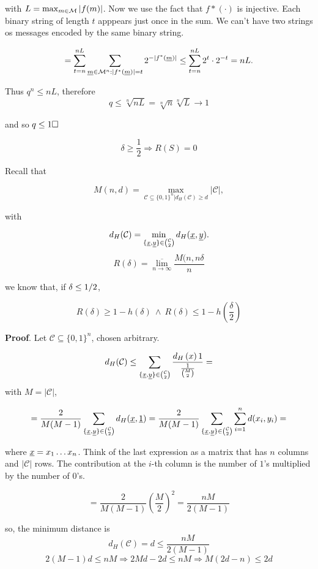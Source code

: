 with $L = \max_{m \in \mathcal{M}} |f(m)|$. Now we use the fact that $f*(\cdot)$ is injective. Each binary string of length $t$ apppears just once in the sum. We can't have two strings os messages encoded by the same binary string.

\[
 = \sum_{t = n}^{nL} \sum_{\underline{m} \in \mathcal{M}^n:|f^*(\underline{m})| = t} 2^{-|f^*(\underline{m})|} \leq \sum_{t = n}^{nL} 2^t \cdot 2^{-t} = nL.
\]

Thus $q^n \leq nL$, therefore $$q \leq \sqrt[n]{nL} = \sqrt[n]{n} \sqrt[n]{L} \rightarrow 1$$    

and so $q \leq 1 \hfill\Box$

\begin{thm}
$$\delta \geq \dfrac{1}{2} \Rightarrow R(S) = 0$$
\end{thm}

Recall that

\[M(n, d) = \max_{\mathcal{C} \subseteq\{0, 1\}^n | d_H(\mathcal{C}) \geq d}|\mathcal{C}|,\]

with

\[
 d_H(\mathcal{C}) = \min_{\{\underline{x}, \underline{y}\}\in\binom{\mathcal{C}}{2}}d_H(\underline{x}, \underline{y}).
\]
\[
 R(\delta) = \overline{\lim_{n \rightarrow \infty}}\dfrac{M(n, n\delta}{n}
\]

we know that, if $\delta \leq {1}/{2}$,

$$ R(\delta) \geq 1 - h(\delta)\ \wedge\ R(\delta) \leq 1 - h(\dfrac{\delta}{2})$$

\noindent\textbf{Proof}. Let $\mathcal{C} \subseteq \{0, 1\}^n$, chosen arbitrary.

\[
 d_H(\mathcal{C}) \leq \sum_{\{\underline{x}, \underline{y}\}\in \binom{\mathcal{C}}{2}} \dfrac{d_H \left({x}\right){1}}{\frac{1}{\binom{M}{2}}} =
\]
with $M = |\mathcal{C}|$,

\[
 = \dfrac{2}{M(M-1)}\sum_{\{\underline{x}, \underline{y}\} \in \binom{\mathcal{C}}{2}} d_H(\underline{x},\underline{1})= \dfrac{2}{M(M-1)}\sum_{\{\underline{x}, \underline{y}\} \in \binom{\mathcal{C}}{2}} \sum_{i=1}^n d(x_i, y_i) = 
\]

where $\underline{x} = x_1\ldots x_n$. Think of the last expression as a matrix that has $n$ columns and $|\mathcal{C}|$ rows. The contribution at the $i$-th column is the number of $1$'s multiplied by the number of $0$'s.

\[
 =  \dfrac{2}{M(M-1)}\left(\dfrac{M}{2}\right)^2 = \dfrac{nM}{2(M-1)}
\]

so, the minimum distance is
\[
 d_H(\mathcal{C}) = d \leq \dfrac{nM}{2(M-1)}
\]
\[
2(M-1)d \leq nM \Rightarrow 2Md -2d \leq nM \Rightarrow M(2d-n) \leq 2d
\]

